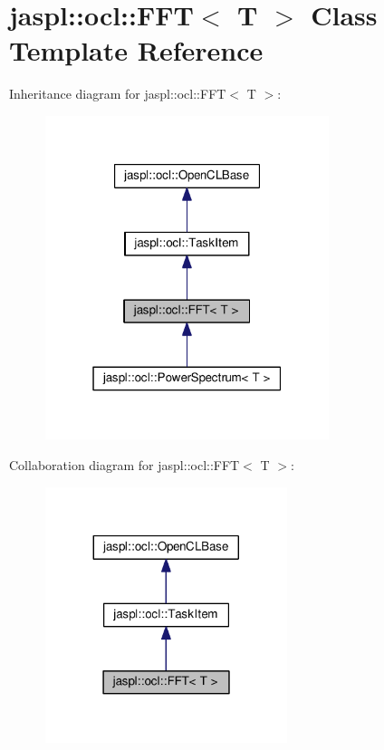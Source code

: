 \hypertarget{classjaspl_1_1ocl_1_1_f_f_t}{}\section{jaspl\+:\+:ocl\+:\+:F\+FT$<$ T $>$ Class Template Reference}
\label{classjaspl_1_1ocl_1_1_f_f_t}


Inheritance diagram for jaspl\+:\+:ocl\+:\+:F\+FT$<$ T $>$\+:\nopagebreak
\begin{figure}[H]
\begin{center}
\leavevmode
\includegraphics[width=235pt]{classjaspl_1_1ocl_1_1_f_f_t__inherit__graph}
\end{center}
\end{figure}


Collaboration diagram for jaspl\+:\+:ocl\+:\+:F\+FT$<$ T $>$\+:\nopagebreak
\begin{figure}[H]
\begin{center}
\leavevmode
\includegraphics[width=200pt]{classjaspl_1_1ocl_1_1_f_f_t__coll__graph}
\end{center}
\end{figure}
